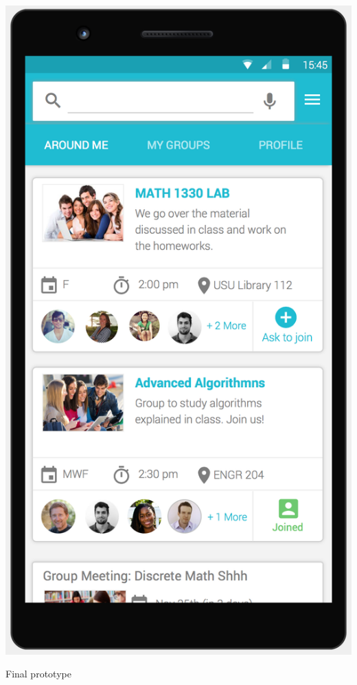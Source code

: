 \documentclass{sigchi-ext}
\begin{document}
\begin{marginfigure}[23pt]
  \begin{minipage}{\marginparwidth}
    \centering
	  \includegraphics[width=0.7\marginparwidth]{figures/beta_prototype.png}
    \caption{Final prototype}~\label{fig:marginfig}
  \end{minipage}
\end{marginfigure}
\end{document}
